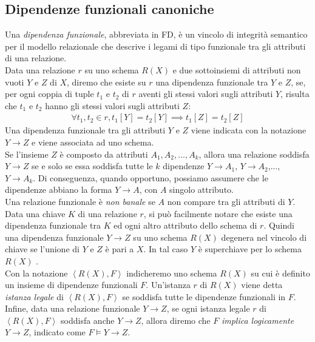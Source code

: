 \subsection{Dipendenze funzionali canoniche}
Una \textit{dipendenza funzionale}, abbreviata in FD, è un vincolo di integrità semantico per il modello relazionale che descrive i legami di tipo funzionale tra gli attributi di una relazione. \\
Data una relazione $r$ su uno schema $R(X)$ e due sottoinsiemi di attributi non vuoti $Y$ e $Z$ di $X$, diremo che esiste su $r$ una dipendenza funzionale tra $Y$ e $Z$, se, per ogni coppia di tuple $t_1$ e $t_2$ di $r$ aventi gli stessi valori sugli attributi $Y$, risulta che $t_1$ e $t_2$ hanno gli stessi valori sugli attributi $Z$:
\begin{eqnarray}
\forall t_1, t_2 \in r, t_1[Y] = t_2[Y] \implies t_1[Z] = t_2[Z]
\end{eqnarray}
Una dipendenza funzionale tra gli attributi $Y$ e $Z$ viene indicata con la notazione $Y \rightarrow Z$ e viene associata ad uno schema.\\
Se l'insieme $Z$ è composto da attributi $A_1, A_2, \ldots, A_k$, allora una relazione soddisfa $Y \rightarrow Z$ se e solo se essa soddisfa tutte le $k$ dipendenze $Y \rightarrow A_1$, $Y \rightarrow A_2$,..., $Y \rightarrow A_k$. Di conseguenza, quando opportuno, possiamo assumere che le dipendenze abbiano la forma $Y \rightarrow A$, con $A$ singolo attributo. \\
Una relazione funzionale è \textit{non banale} se $A$ non compare tra gli attributi di $Y$. \\
Data una chiave $K$ di una relazione $r$, si può facilmente notare che esiste una dipendenza funzionale tra $K$ ed ogni altro attributo dello schema di $r$. Quindi una dipendenza funzionale $Y \rightarrow Z$ su uno schema $R(X)$ degenera nel vincolo di chiave se l'unione di $Y$ e $Z$ è pari a $X$. In tal caso $Y$ è superchiave per lo schema $R(X)$ . \\
Con la notazione $\left\langle R(X), F \right\rangle$ indicheremo uno schema $R(X)$ su cui è definito un insieme di dipendenze funzionali $F$. Un'istanza $r$ di $R(X)$ viene detta \textit{istanza legale} di  $\left\langle R(X), F \right\rangle$ se soddisfa tutte le dipendenze funzionali in $F$. Infine, data una relazione funzionale $Y \rightarrow Z$, se ogni istanza legale $r$ di $\left\langle R(X), F \right\rangle$ soddisfa anche $Y \rightarrow Z$, allora diremo che $F$ \textit{implica logicamente} $Y \rightarrow Z$, indicato come $F \models Y \rightarrow Z$.\\
